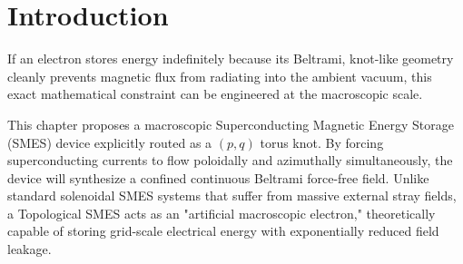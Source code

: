 \section{Introduction}
If an electron stores energy indefinitely because its Beltrami, knot-like geometry cleanly prevents magnetic flux from radiating into the ambient vacuum, this exact mathematical constraint can be engineered at the macroscopic scale.

This chapter proposes a macroscopic Superconducting Magnetic Energy Storage (SMES) device explicitly routed as a $(p,q)$ torus knot. By forcing superconducting currents to flow poloidally and azimuthally simultaneously, the device will synthesize a confined continuous Beltrami force-free field. Unlike standard solenoidal SMES systems that suffer from massive external stray fields, a Topological SMES acts as an "artificial macroscopic electron," theoretically capable of storing grid-scale electrical energy with exponentially reduced field leakage.

